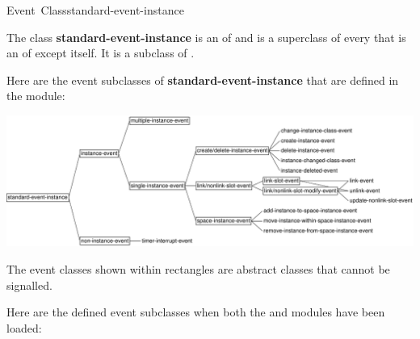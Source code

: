 \documentclass[10pt,twoside,english,pdftex]{article}
\begin{document}
\begin{functiondoc}{Event~Class}{standard-event-instance}{}
%
%
  
\fnsyntax

\fnpackage {}

\fnmodule {}

\fndescription 
{}%
The class \textbf{standard-event-instance} is an  of
\textbf{} and is a superclass of every
 that is an  of
\textbf{} except itself.  It is a subclass
of \textbf{}.

%
Here are the event subclasses of \textbf{standard-event-instance}
that are defined in the  
module:

\T\begin{ifhtml}
\T\end{ifhtml}
\W\begin{iftex} 
\begin{center}
\includegraphics[scale=0.85]{gbbopen-events}
\end{center}
\W\end{iftex}

\noindent The event classes shown within rectangles are abstract classes
that cannot be signalled.

\W{}

Here are the defined event subclasses when both the
 and  modules have been loaded:


\end{functiondoc}
\end{document}
